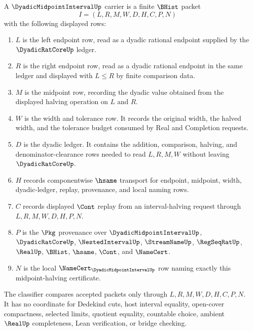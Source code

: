\begin{definition}
\label{def:dyadic-midpoint-interval-carrier}
A $\DyadicMidpointIntervalUp$ carrier is a finite $\BHist$ packet
$$
I=(L,R,M,W,D,H,C,P,N)
$$
with the following displayed rows:
\begin{enumerate}
\item $L$ is the left endpoint row, read as a dyadic rational endpoint supplied by the $\DyadicRatCoreUp$ ledger.
\item $R$ is the right endpoint row, read as a dyadic rational endpoint in the same ledger and displayed with $L \leq R$ by finite comparison data.
\item $M$ is the midpoint row, recording the dyadic value obtained from the displayed halving operation on $L$ and $R$.
\item $W$ is the width and tolerance row. It records the original width, the halved width, and the tolerance budget consumed by Real and Completion requests.
\item $D$ is the dyadic ledger. It contains the addition, comparison, halving, and denominator-clearance rows needed to read $L,R,M,W$ without leaving $\DyadicRatCoreUp$.
\item $H$ records componentwise $\hsame$ transport for endpoint, midpoint, width, dyadic-ledger, replay, provenance, and local naming rows.
\item $C$ records displayed $\Cont$ replay from an interval-halving request through $L,R,M,W,D,H,P,N$.
\item $P$ is the $\Pkg$ provenance over $\DyadicMidpointIntervalUp$, $\DyadicRatCoreUp$, $\NestedIntervalUp$, $\StreamNameUp$, $\RegSeqRatUp$, $\RealUp$, $\BHist$, $\hsame$, $\Cont$, and $\NameCert$.
\item $N$ is the local $\NameCert_{\DyadicMidpointIntervalUp}$ row naming exactly this midpoint-halving certificate.
\end{enumerate}
The classifier compares accepted packets only through $L,R,M,W,D,H,C,P,N$. It has no coordinate for Dedekind cuts, host interval equality, open-cover compactness, selected limits, quotient equality, countable choice, ambient $\RealUp$ completeness, Lean verification, or bridge checking.
\end{definition}

